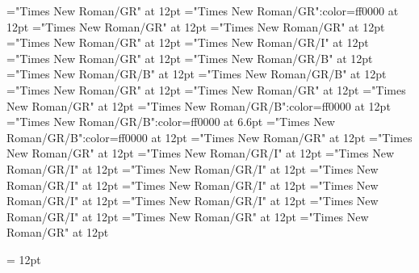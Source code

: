 \documentclass[a4paper]{article}
\begin{document}
\pagestyle{plain}
\sloppy
\setlength{\parfillskip}{0pt plus 1fil}
\font\spanen="Times New Roman/GR" at 12pt
\font\spanur="Times New Roman/GR":color=ff0000 at 12pt
\font\diven="Times New Roman/GR" at 12pt
\font\divur="Times New Roman/GR" at 12pt
\font\xitemxitemdefinitionbefore="Times New Roman/GR" at 12pt
\font\xitemxitemexamplebefore="Times New Roman/GR/I" at 12pt
\font\xitemxitemexamplesbefore="Times New Roman/GR" at 12pt
\font\xitemxitemheadwordbefore="Times New Roman/GR/B" at 12pt
\font\xitemxitemheadwordminorbefore="Times New Roman/GR/B" at 12pt
\font\xitemxitemLexEntrypublishRootMinorPrimaryTargetHeadWordRefbefore="Times New Roman/GR/B" at 12pt
\font\xitemxitemlexreftargetsbefore="Times New Roman/GR" at 12pt
\font{}="Times New Roman/GR" at 12pt
\font\entryletDatadicBody="Times New Roman/GR" at 12pt
\font\headwordurentryletDatadicBody="Times New Roman/GR/B":color=ff0000 at 12pt
\font\xhomographnumberheadwordurentryletDatadicBody="Times New Roman/GR/B":color=ff0000 at 6.6pt
\font\spanenheadwordurentryletDatadicBody="Times New Roman/GR/B":color=ff0000 at 12pt
\font\sensesentryletDatadicBody="Times New Roman/GR" at 12pt
\font\sensesensesentryletDatadicBody="Times New Roman/GR" at 12pt
\font\grammaticalinfosensesensesentryletDatadicBody="Times New Roman/GR/I" at 12pt
\font\partofspeechengrammaticalinfosensesensesentryletDatadicBody="Times New Roman/GR/I" at 12pt
\font\spanenpartofspeechengrammaticalinfosensesensesentryletDatadicBody="Times New Roman/GR/I" at 12pt
\font\slotsgrammaticalinfosensesensesentryletDatadicBody="Times New Roman/GR/I" at 12pt
\font\spanenslotsgrammaticalinfosensesensesentryletDatadicBody="Times New Roman/GR/I" at 12pt
\font\slotnameenslotsgrammaticalinfosensesensesentryletDatadicBody="Times New Roman/GR/I" at 12pt
\font\spanenslotnameenslotsgrammaticalinfosensesensesentryletDatadicBody="Times New Roman/GR/I" at 12pt
\font\spanengrammaticalinfosensesensesentryletDatadicBody="Times New Roman/GR/I" at 12pt
\font{}="Times New Roman/GR" at 12pt
\font\spanendefinitionensensesensesentryletDatadicBody="Times New Roman/GR" at 12pt

\mbox{} 
\newpage 
\newpage 
\setcounter{page}{1} 
\pagestyle{fancy} 
\setlength{\columnsep}{1.5em} 
\setlength\columnseprule{0.4pt} 
\begin{multicols}{2}{\raggedleft} \begin{spacing}{1.5}
\hangindent= 12pt
  \spanenslotsgrammaticalinfosensesensesentryletDatadicBody{: }  \end{spacing}
 \end{multicols}
\end{document}
